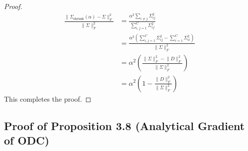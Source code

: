 \documentclass{article}
\theoremstyle{plain}
\theoremstyle{definition}
\theoremstyle{remark}
\begin{document}
\begin{proof}
\begin{align*}
  \frac{\big\| \Sigma_{\text{shrunk}}(\alpha) - \Sigma \big\|_F^2}{\big\| \Sigma \big\|_F^2} &= \frac{\alpha^2 \sum_{i \neq j} \Sigma_{ij}^2}{\sum_{i,j=1}^C \Sigma_{ij}^2} \\
  &= \frac{\alpha^2 \left( \sum_{i,j=1}^C \Sigma_{ij}^2 - \sum_{i=1}^C \Sigma_{ii}^2 \right)}{\big\| \Sigma \big\|_F^2} \\
  &= \alpha^2 \left( \frac{\big\| \Sigma \big\|_F^2 - \big\| D \big\|_F^2}{\big\| \Sigma \big\|_F^2} \right) \\
  &= \alpha^2 \left( 1 - \frac{\big\| D \big\|_F^2}{\big\| \Sigma \big\|_F^2} \right)
\end{align*}
This completes the proof.
\end{proof}

\subsection{Proof of Proposition 3.8 (Analytical Gradient of ODC)}
\label{sec:proofs_odc_gradient}
\end{document}
